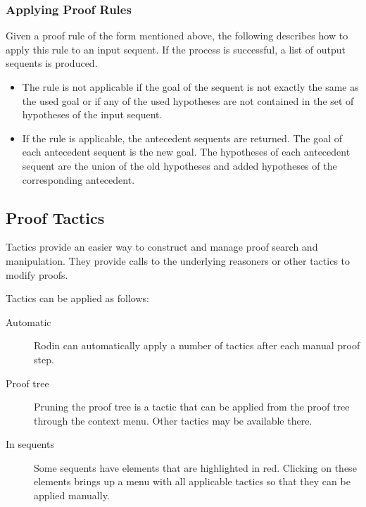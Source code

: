 \subsubsection{Applying Proof Rules}

Given a proof rule of the form mentioned above, the following describes how to apply this rule to an input sequent. If the process is successful, a list of output sequents is produced. 

\begin{itemize}
	\item The rule is not applicable if the goal of the sequent is not exactly the same as the used goal or if any of the used hypotheses are not contained in the set of hypotheses of the input sequent. 
	\item If the rule is applicable, the antecedent sequents are returned. The goal of each antecedent sequent is the new goal. The hypotheses of each antecedent sequent are the union of the old hypotheses and added hypotheses of the corresponding antecedent. 
\end{itemize}


\subsection{Proof Tactics}
\label{proof_tactics}

Tactics provide an easier way to construct and manage proof search and manipulation. They provide calls to the underlying reasoners or other tactics to modify proofs.


Tactics can be applied as follows:

\begin{description}
	\item[Automatic] Rodin can automatically apply a number of tactics after each manual proof step.
	\item[Proof tree] Pruning the proof tree is a tactic that can be applied from the proof tree through the context menu.  Other tactics may be available there.
	\item[In sequents] Some sequents have elements that are highlighted in red.  Clicking on these elements brings up a menu with all applicable tactics so that they can be applied manually.
\end{description}

